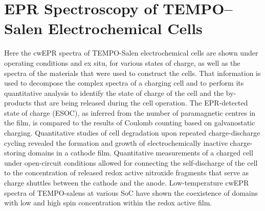 \chapter{EPR Spectroscopy of TEMPO--Salen Electrochemical Cells}
\label{ch:SPINS_AT_WORK}
Here the cwEPR spectra of TEMPO-Salen electrochemical cells are shown under operating conditions and ex situ, for various states of charge, as well as the spectra of the materials that were used to construct the cells.
That information is used to decompose the complex spectra of a charging cell and to perform its quantitative analysis to identify the state of charge of the cell and the by-products that are being released during the cell operation. The EPR-detected state of charge (ESOC), as inferred from the number of paramagnetic centres in the film, is compared to the results of Coulomb counting based on galvanostatic charging. Quantitative studies of cell degradation upon repeated charge-discharge cycling revealed the formation and growth of electrochemically inactive charge-storing domains in a cathode film. Quantitative measurements of a charged cell under open-circuit conditions allowed for connecting the self-discharge of the cell to the concentration of released redox active nitroxide fragments that serve as charge shuttles between the cathode and the anode. Low-temperature cwEPR spectra of TEMPO-salens at various SoC have shown the coexistence of domains with low and high spin concentration within the redox active film.


